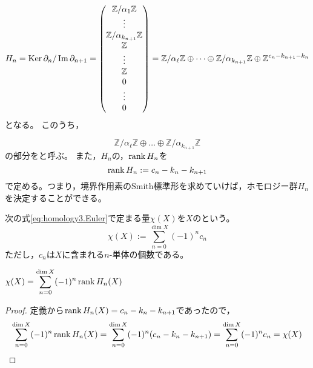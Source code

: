 \documentclass[uplatex]{jsarticle}
\begin{document}
\begin{equation}
  H_{n} = \operatorname{Ker} \partial_{n} / \operatorname{Im} \partial_{n+1}
  = \begin{pmatrix}
    \mathbb{Z} / \alpha_{1} \mathbb{Z} \\ \vdots \\ \mathbb{Z} / \alpha_{k_{n+1}} \mathbb{Z} \\ \mathbb{Z} \\ \vdots \\ \mathbb{Z} \\ 0 \\ \vdots \\ 0
  \end{pmatrix}
  = \mathbb{Z} / \alpha_{\ell} \mathbb{Z} \oplus \dots \oplus \mathbb{Z} / \alpha_{k_{n+1}} \mathbb{Z} \oplus \mathbb{Z}^{c_{n} - k_{n+1} - k_{n}}
\end{equation}
となる。
このうち，

\begin{equation}
  \mathbb{Z} / \alpha_{\ell} \mathbb{Z} \oplus \dots \oplus \mathbb{Z} / \alpha_{k_{n+1}} \mathbb{Z}
\end{equation}
の部分をと呼ぶ。
また，$H_{n}$の，$\operatorname{rank} H_{n}$を
\begin{equation}
  \operatorname{rank} H_{n} := c_{n} - k_{n} - k_{n+1}
\end{equation}
で定める。つまり，境界作用素のSmith標準形を求めていけば，ホモロジー群$H_{n}$を決定することができる。

\sukima {}

\begin{teigi}
  次の式\eqref{eq:homology3.Euler}で定まる量$\chi (X)$を$X$のという。
  \begin{equation}
    \label{eq:homology3.Euler}
    \chi (X) := \sum_{n=0}^{\dim X} (-1)^{n} c_{n}
  \end{equation}
  ただし，$c_{n}$は$X$に含まれる$n$-単体の個数である。
\end{teigi}

\begin{prop}
  ${\displaystyle \chi (X) = \sum_{n=0}^{\dim X} (-1)^{n} \operatorname{rank} H_{n} (X)}$
\end{prop}

\begin{proof}
  定義から$\operatorname{rank} H_{n} (X) = c_{n} - k_{n} - k_{n+1}$であったので，
  \begin{equation}
    \sum_{n=0}^{\dim X} (-1)^{n} \operatorname{rank} H_{n} (X) = \sum_{n=0}^{\dim X} (-1)^{n} (c_{n} - k_{n} - k_{n+1}) = \sum_{n=0}^{\dim X} (-1)^{n} c_{n} = \chi (X)
  \end{equation}
\end{proof}
\end{document}
